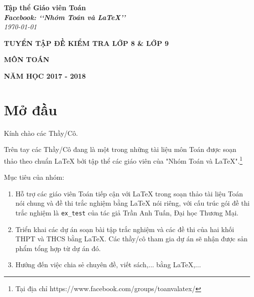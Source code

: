 \documentclass[12pt,a4paper,oneside]{book}
\renewcommand{\baselinestretch}{1.4}
\begin{document}
\providecommand*{\dx}{\ensuremath{\mathrm{\,d}}x}
\providecommand*{\unit}[1]{\ensuremath{\mathrm{\,#1}}}

\begin{titlepage}
\begin{flushright}
\fontsize{17}{0}\selectfont
\textbf{Tập thể Giáo viên Toán}\\
\textbf{\textit{Facebook: \lq\lq Nhóm Toán và LaTeX\rq\rq}}\\
\textit{\color{red}\today}
\end{flushright}

\vspace{4cm}

\begin{flushright}

\vspace{1cm}

 \textbf{\fontsize{30}{0}\selectfont T\fontsize{20}{0}\selectfont UYỂN TẬP ĐỀ KIỂM TRA LỚP 8 \& LỚP 9}
 
 \vspace{1cm}
 
 \textbf{\fontsize{35}{0}\selectfont MÔN TOÁN}
\end{flushright}

\vfill{
\begin{flushright}
\fontsize{17}{0}\textbf{NĂM HỌC 2017 - 2018}
\end{flushright}
}
\end{titlepage}
\pagestyle{empty}
\renewcommand{\headrulewidth}{0.4pt}

{\renewcommand{\baselinestretch}{1.3}
\tableofcontents
}

\pagestyle{fancy}
\lhead{\empty}
\rhead{\empty}
\lfoot{\currfilename}
\chapter*{Mở đầu}
Kính chào các Thầy/Cô.

\vspace{0.6cm}

\noindent Trên tay các Thầy/Cô đang là một trong những tài liệu môn Toán được soạn thảo theo chuẩn \LaTeX{} bởi tập thể các giáo viên của "Nhóm Toán và LaTeX".\footnote{Tại địa chỉ https://www.facebook.com/groups/toanvalatex/}

\vspace{0.6cm}

\noindent Mục tiêu của nhóm: 
\begin{enumerate}
\item Hỗ trợ các giáo viên Toán tiếp cận với \LaTeX{} trong soạn thảo tài liệu Toán nói chung và đề thi trắc nghiệm bằng \LaTeX{} nói riêng, với cấu trúc gói đề thi trắc nghiệm là \texttt{ex\_test} của tác giả Trần Anh Tuấn, Đại học Thương Mại.
\item Triển khai các dự án soạn bài tập trắc nghiệm và các đề thi của hai khối THPT và THCS bằng \LaTeX{}. Các thầy/cô tham gia dự án sẽ nhận được sản phẩm tổng hợp từ dự án đó.
\item Hướng đến việc chia sẻ chuyên đề, viết sách,... bằng \LaTeX,...
\end{enumerate}
\end{document}
